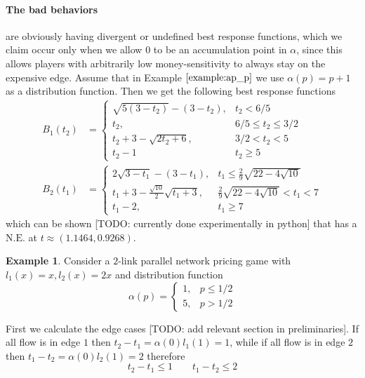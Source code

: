 \documentclass[10pt,a4paper]{book}
\newcommand{\NE}{\mathrm{N.E.}}
\theoremstyle{definition}
\theoremstyle{comment}
\newtheorem{example}[definition]{Example}
\begin{document}
\paragraph{The bad behaviors} are obviously having divergent or undefined best response functions, which we claim occur only when we allow $0$ to be an accumulation point in $\alpha$, since this allows players with arbitrarily low money-sensitivity to always stay on the expensive edge.
Assume that in Example $\ref{example:ap_p}$ we use $\alpha(p) = p + 1$ as a distribution function.
Then we get the following best response functions
\begin{align*}
	B_1(t_2) &=
	\begin{cases}
		\sqrt{5 (3 - t_2)} - (3 - t_2), & t_2 < 6/5 \\
		t_2, & 6/5 \le t_2 \le 3/2 \\
		t_2 + 3 - \sqrt{2 t_2 + 6}, & 3/2 < t_2 < 5 \\
		t_2 - 1 & t_2 \ge 5
	\end{cases}\\
	B_2(t_1) &=
	\begin{cases}
		2 \sqrt{3 - t_1} - (3 - t_1), & t_1 \le \frac29 \sqrt{22 - 4 \sqrt{10}} \\
		t_1 + 3 - \frac{\sqrt{10}}2 \sqrt{t_1 + 3}, & \frac29 \sqrt{22 - 4 \sqrt{10}} < t_1 < 7 \\
		t_1 - 2, & t_1 \ge 7
	\end{cases}
\end{align*}
which can be shown [TODO: currently done experimentally in python] that has a $\NE$ at $t \approx (1.1464, 0.9268)$.


\begin{example}
	Consider a $2$-link parallel network pricing game with $l_1(x) = x, l_2(x) = 2x$ and distribution function
	\[
		\alpha(p) =
		\begin{cases}
			1, & p \le 1/2 \\
			5, & p > 1/2
		\end{cases}
	\]
\end{example}

First we calculate the edge cases [TODO: add relevant section in preliminaries].
If all flow is in edge $1$ then $t_2 - t_1 = \alpha(0) l_1(1) = 1$, while if all flow is in edge $2$ then $t_1 - t_2 = \alpha(0) l_2(1) = 2$ therefore
\[t_2 - t_1 \le 1 \qquad t_1 - t_2 \le 2\]
\end{document}
